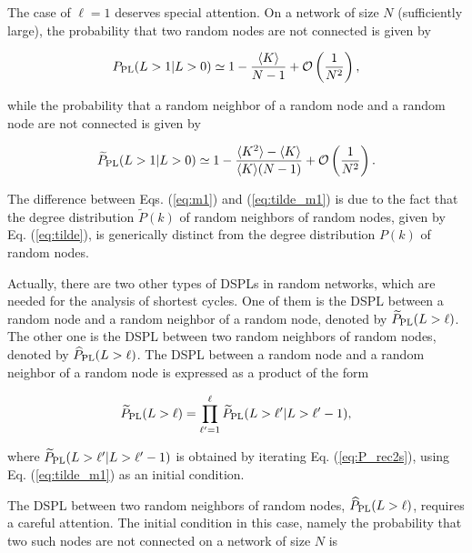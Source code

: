\documentclass[preprint,pre,superscriptaddress,showpacs]{revtex4}
\begin{document}
The case of $\ell=1$ deserves special attention.
On a network of size $N$ (sufficiently large),
the probability that two random nodes 
are not connected is given by
\cite{Nitzan2016}

\begin{equation}
P_{\rm PL}(L>1 | L>0) \simeq 1 - \frac{\langle K \rangle}{N-1} 
+ {\cal O} \left(\frac{1}{N^2}  \right),
\label{eq:m1}
\end{equation}

\noindent
while
the probability that a random neighbor of a random node and a random node
are not connected is given by

\begin{equation}
{\widetilde P}_{\rm PL}(L>1 | L>0) \simeq 1 - 
\frac{\langle K^2 \rangle - \langle K \rangle}{\langle K \rangle (N-1)}
+ {\cal O} \left(\frac{1}{N^2}  \right).
\label{eq:tilde_m1}
\end{equation}

\noindent
The difference between Eqs.
(\ref{eq:m1})
and
(\ref{eq:tilde_m1})
is due to the fact that the degree distribution 
${\widetilde P}(k)$ of 
random neighbors of random nodes,
given by Eq. (\ref{eq:tilde}),
is generically distinct from the degree
distribution 
$P(k)$
of random nodes.

Actually, there are two other types of DSPLs in random networks,
which are needed for the analysis of shortest cycles. One of them is the
DSPL between a random node and a random neighbor of a random node,
denoted by ${\widetilde P}_{\rm PL}(L>\ell)$. 
The other one is the DSPL between
two random neighbors of random nodes,
denoted by $\widehat P_{\rm PL}(L>\ell)$.
The DSPL between a random node and a 
random neighbor of a random node is expressed
as a product of the form

\begin{equation}
\widetilde P_{\rm PL}(L>\ell) = \prod_{\ell^{\prime}=1}^{\ell}
\widetilde P_{\rm PL}(L>\ell^{\prime} | L>\ell^{\prime}-1),
\label{eq:prodtilde}
\end{equation}

\noindent
where
$\widetilde P_{\rm  PL}(L>\ell^{\prime}| L>\ell^{\prime}-1)$
is obtained by iterating Eq.
(\ref{eq:P_rec2s}),
using Eq. (\ref{eq:tilde_m1})
as an initial condition.

The DSPL between two 
random neighbors of random nodes,
$\widehat P_{\rm PL}(L>\ell)$,
requires a careful attention.
The initial condition in this case, namely the probability 
that two such nodes are not connected 
on a network of size $N$ is
\end{document}
